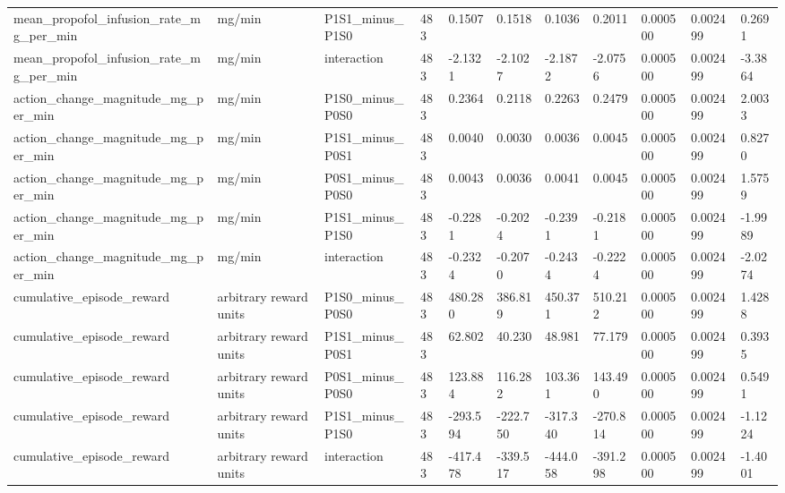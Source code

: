 \begin{tabular}{lllllllllll}
mean\_propofol\_infusion\_rate\_mg\_per\_min & mg/min & P1S1\_minus\_P1S0 & 483 & 0.1507 & 0.1518 & 0.1036 & 0.2011 & 0.000500 & 0.002499 & 0.2691 \\
mean\_propofol\_infusion\_rate\_mg\_per\_min & mg/min & interaction & 483 & -2.1321 & -2.1027 & -2.1872 & -2.0756 & 0.000500 & 0.002499 & -3.3864 \\
action\_change\_magnitude\_mg\_per\_min & mg/min & P1S0\_minus\_P0S0 & 483 & 0.2364 & 0.2118 & 0.2263 & 0.2479 & 0.000500 & 0.002499 & 2.0033 \\
action\_change\_magnitude\_mg\_per\_min & mg/min & P1S1\_minus\_P0S1 & 483 & 0.0040 & 0.0030 & 0.0036 & 0.0045 & 0.000500 & 0.002499 & 0.8270 \\
action\_change\_magnitude\_mg\_per\_min & mg/min & P0S1\_minus\_P0S0 & 483 & 0.0043 & 0.0036 & 0.0041 & 0.0045 & 0.000500 & 0.002499 & 1.5759 \\
action\_change\_magnitude\_mg\_per\_min & mg/min & P1S1\_minus\_P1S0 & 483 & -0.2281 & -0.2024 & -0.2391 & -0.2181 & 0.000500 & 0.002499 & -1.9989 \\
action\_change\_magnitude\_mg\_per\_min & mg/min & interaction & 483 & -0.2324 & -0.2070 & -0.2434 & -0.2224 & 0.000500 & 0.002499 & -2.0274 \\
cumulative\_episode\_reward & arbitrary reward units & P1S0\_minus\_P0S0 & 483 & 480.280 & 386.819 & 450.371 & 510.212 & 0.000500 & 0.002499 & 1.4288 \\
cumulative\_episode\_reward & arbitrary reward units & P1S1\_minus\_P0S1 & 483 & 62.802 & 40.230 & 48.981 & 77.179 & 0.000500 & 0.002499 & 0.3935 \\
cumulative\_episode\_reward & arbitrary reward units & P0S1\_minus\_P0S0 & 483 & 123.884 & 116.282 & 103.361 & 143.490 & 0.000500 & 0.002499 & 0.5491 \\
cumulative\_episode\_reward & arbitrary reward units & P1S1\_minus\_P1S0 & 483 & -293.594 & -222.750 & -317.340 & -270.814 & 0.000500 & 0.002499 & -1.1224 \\
cumulative\_episode\_reward & arbitrary reward units & interaction & 483 & -417.478 & -339.517 & -444.058 & -391.298 & 0.000500 & 0.002499 & -1.4001 \\
\hline
\end{tabular}
